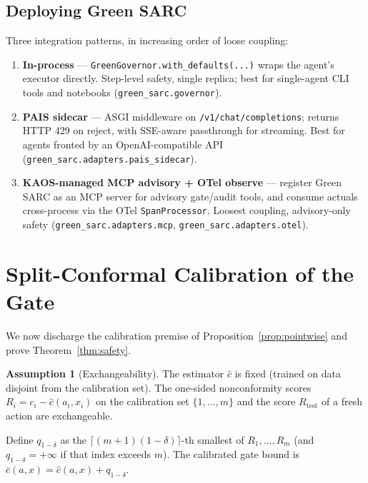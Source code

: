 \documentclass[11pt]{article}
\theoremstyle{plain}
\theoremstyle{definition}
\newtheorem{assumption}{Assumption}
\theoremstyle{remark}
\begin{document}
\subsection{Deploying Green SARC}\label{sec:deploy}
Three integration patterns, in increasing order of loose coupling:
\begin{enumerate}[leftmargin=1.5em,itemsep=2pt]
\item \textbf{In-process} --- \texttt{GreenGovernor.with\_defaults(...)} wraps the agent's executor directly. Step-level safety, single replica; best for single-agent CLI tools and notebooks (\texttt{green\_sarc.governor}).
\item \textbf{PAIS sidecar} --- ASGI middleware on \texttt{/v1/chat/completions}; returns HTTP 429 on reject, with SSE-aware passthrough for streaming. Best for agents fronted by an OpenAI-compatible API (\texttt{green\_sarc.adapters.pais\_sidecar}).
\item \textbf{KAOS-managed MCP advisory + OTel observe} --- register Green SARC as an MCP server for advisory gate/audit tools, and consume actuals cross-process via the OTel \texttt{SpanProcessor}. Loosest coupling, advisory-only safety (\texttt{green\_sarc.adapters.mcp}, \texttt{green\_sarc.adapters.otel}).
\end{enumerate}

\section{Split-Conformal Calibration of the Gate}\label{sec:conformal}

We now discharge the calibration premise of Proposition~\ref{prop:pointwise} and prove Theorem~\ref{thm:safety}.

\begin{assumption}[Exchangeability]\label{asm:exch}
The estimator $\hat c$ is fixed (trained on data disjoint from the calibration set). The one-sided nonconformity scores $R_i = c_i - \hat c(a_i,x_i)$ on the calibration set $\{1,\dots,m\}$ and the score $R_{\mathrm{test}}$ of a fresh action are exchangeable.
\end{assumption}

Define $q_{1-\delta}$ as the $\lceil (m+1)(1-\delta)\rceil$-th smallest of $R_1,\dots,R_m$ (and $q_{1-\delta}=+\infty$ if that index exceeds $m$). The calibrated gate bound is $\bar c(a,x) = \hat c(a,x) + q_{1-\delta}$.
\end{document}
